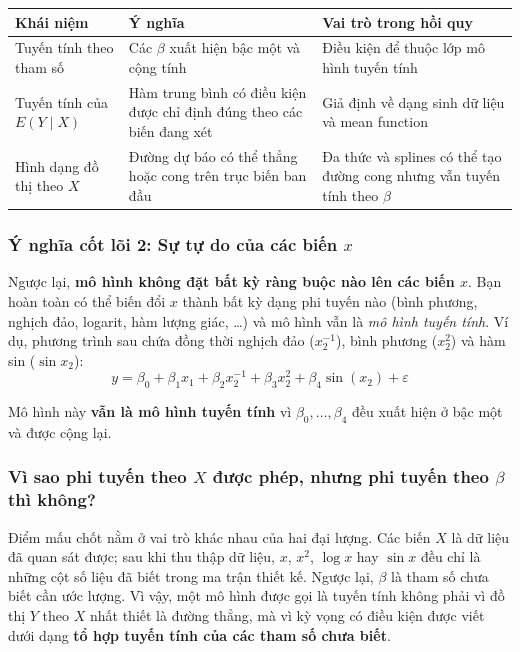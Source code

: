 \begin{center}
\small
\begin{tabularx}{\textwidth}{@{}>{\raggedright\arraybackslash}p{3.5cm}>{\raggedright\arraybackslash}X>{\raggedright\arraybackslash}X@{}}
\toprule
\textbf{Khái niệm} & \textbf{Ý nghĩa} & \textbf{Vai trò trong hồi quy} \\
\midrule
Tuyến tính theo tham số & Các $\beta$ xuất hiện bậc một và cộng tính & Điều kiện để thuộc lớp mô hình tuyến tính \cite[Sec.~7.3.1, p.~141]{rencher2008linear} \\
Tuyến tính của $E(Y\mid X)$ & Hàm trung bình có điều kiện được chỉ định đúng theo các biến đang xét & Giả định về dạng sinh dữ liệu và mean function \cite[Sec.~1.2; Sec.~3.4.1]{weisberg2014applied} \\
Hình dạng đồ thị theo $X$ & Đường dự báo có thể thẳng hoặc cong trên trục biến ban đầu & Đa thức và splines có thể tạo đường cong nhưng vẫn tuyến tính theo $\beta$ \cite[Ch.~5, pp.~109--115]{weisberg2014applied} \\
\bottomrule
\end{tabularx}
\end{center}

\subsubsection{Ý nghĩa cốt lõi 2: Sự tự do của các biến \texorpdfstring{$x$}{x}}

Ngược lại, \textbf{mô hình không đặt bất kỳ ràng buộc nào lên các biến $x$}. Bạn hoàn toàn có thể biến đổi $x$ thành bất kỳ dạng phi tuyến nào (bình phương, nghịch đảo, logarit, hàm lượng giác, \ldots) và mô hình vẫn là \textit{mô hình tuyến tính}. Ví dụ, phương trình sau chứa đồng thời nghịch đảo ($x_2^{-1}$), bình phương ($x_2^2$) và hàm sin ($\sin x_2$):
\[
  y = \beta_0 + \beta_1 x_1 + \beta_2 x_2^{-1} + \beta_3 x_2^2 + \beta_4 \sin(x_2) + \varepsilon
\]

Mô hình này \textbf{vẫn là mô hình tuyến tính} vì $\beta_0, \ldots, \beta_4$ đều xuất hiện ở bậc một và được cộng lại.

\subsubsection{Vì sao phi tuyến theo \texorpdfstring{$X$}{X} được phép, nhưng phi tuyến theo \texorpdfstring{$\beta$}{beta} thì không?}

Điểm mấu chốt nằm ở vai trò khác nhau của hai đại lượng. Các biến $X$ là dữ liệu đã quan sát được; sau khi thu thập dữ liệu, $x$, $x^2$, $\log x$ hay $\sin x$ đều chỉ là những cột số liệu đã biết trong ma trận thiết kế. Ngược lại, $\beta$ là tham số chưa biết cần ước lượng. Vì vậy, một mô hình được gọi là tuyến tính không phải vì đồ thị $Y$ theo $X$ nhất thiết là đường thẳng, mà vì kỳ vọng có điều kiện được viết dưới dạng \textbf{tổ hợp tuyến tính của các tham số chưa biết}.

